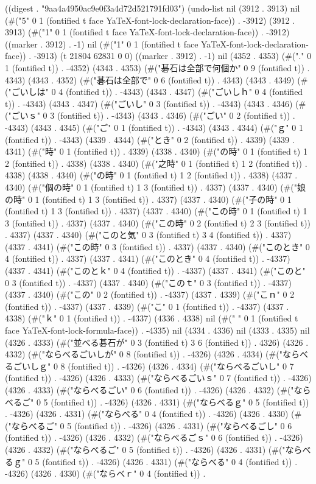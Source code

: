 
((digest . "9aa4a4950ac9e0f3a4d72d521791fd03") (undo-list nil (3912 . 3913) nil (#("5" 0 1 (fontified t face YaTeX-font-lock-declaration-face)) . -3912) (3912 . 3913) (#("1" 0 1 (fontified t face YaTeX-font-lock-declaration-face)) . -3912) ((marker . 3912) . -1) nil (#("1" 0 1 (fontified t face YaTeX-font-lock-declaration-face)) . -3913) (t 21804 62831 0 0) ((marker . 3912) . -1) nil (4352 . 4353) (#("." 0 1 (fontified t)) . -4352) (4343 . 4353) (#("碁石は全部で何個か" 0 9 (fontified t)) . 4343) (4343 . 4352) (#("碁石は全部で" 0 6 (fontified t)) . 4343) (4343 . 4349) (#("ごいしは" 0 4 (fontified t)) . -4343) (4343 . 4347) (#("ごいしｈ" 0 4 (fontified t)) . -4343) (4343 . 4347) (#("ごいし" 0 3 (fontified t)) . -4343) (4343 . 4346) (#("ごいｓ" 0 3 (fontified t)) . -4343) (4343 . 4346) (#("ごい" 0 2 (fontified t)) . -4343) (4343 . 4345) (#("ご" 0 1 (fontified t)) . -4343) (4343 . 4344) (#("ｇ" 0 1 (fontified t)) . -4343) (4339 . 4344) (#("とき" 0 2 (fontified t)) . 4339) (4339 . 4341) (#("時" 0 1 (fontified t)) . 4339) (4338 . 4340) (#("の時" 0 1 (fontified t) 1 2 (fontified t)) . 4338) (4338 . 4340) (#("之時" 0 1 (fontified t) 1 2 (fontified t)) . 4338) (4338 . 4340) (#("の時" 0 1 (fontified t) 1 2 (fontified t)) . 4338) (4337 . 4340) (#("個の時" 0 1 (fontified t) 1 3 (fontified t)) . 4337) (4337 . 4340) (#("娘の時" 0 1 (fontified t) 1 3 (fontified t)) . 4337) (4337 . 4340) (#("子の時" 0 1 (fontified t) 1 3 (fontified t)) . 4337) (4337 . 4340) (#("この時" 0 1 (fontified t) 1 3 (fontified t)) . 4337) (4337 . 4340) (#("この時" 0 2 (fontified t) 2 3 (fontified t)) . 4337) (4337 . 4340) (#("このと気" 0 3 (fontified t) 3 4 (fontified t)) . 4337) (4337 . 4341) (#("この時" 0 3 (fontified t)) . 4337) (4337 . 4340) (#("このとき" 0 4 (fontified t)) . 4337) (4337 . 4341) (#("このとき" 0 4 (fontified t)) . -4337) (4337 . 4341) (#("このとｋ" 0 4 (fontified t)) . -4337) (4337 . 4341) (#("このと" 0 3 (fontified t)) . -4337) (4337 . 4340) (#("このｔ" 0 3 (fontified t)) . -4337) (4337 . 4340) (#("この" 0 2 (fontified t)) . -4337) (4337 . 4339) (#("こｎ" 0 2 (fontified t)) . -4337) (4337 . 4339) (#("こ" 0 1 (fontified t)) . -4337) (4337 . 4338) (#("ｋ" 0 1 (fontified t)) . -4337) (4336 . 4338) nil (#(" " 0 1 (fontified t face YaTeX-font-lock-formula-face)) . -4335) nil (4334 . 4336) nil (4333 . 4335) nil (4326 . 4333) (#("並べる碁石が" 0 3 (fontified t) 3 6 (fontified t)) . 4326) (4326 . 4332) (#("ならべるごいしが" 0 8 (fontified t)) . -4326) (4326 . 4334) (#("ならべるごいしｇ" 0 8 (fontified t)) . -4326) (4326 . 4334) (#("ならべるごいし" 0 7 (fontified t)) . -4326) (4326 . 4333) (#("ならべるごいｓ" 0 7 (fontified t)) . -4326) (4326 . 4333) (#("ならべるごい" 0 6 (fontified t)) . -4326) (4326 . 4332) (#("ならべるご" 0 5 (fontified t)) . -4326) (4326 . 4331) (#("ならべるｇ" 0 5 (fontified t)) . -4326) (4326 . 4331) (#("ならべる" 0 4 (fontified t)) . -4326) (4326 . 4330) (#("ならべるご" 0 5 (fontified t)) . -4326) (4326 . 4331) (#("ならべるごし" 0 6 (fontified t)) . -4326) (4326 . 4332) (#("ならべるごｓ" 0 6 (fontified t)) . -4326) (4326 . 4332) (#("ならべるご" 0 5 (fontified t)) . -4326) (4326 . 4331) (#("ならべるｇ" 0 5 (fontified t)) . -4326) (4326 . 4331) (#("ならべる" 0 4 (fontified t)) . -4326) (4326 . 4330) (#("ならべｒ" 0 4 (fontified t)) . 